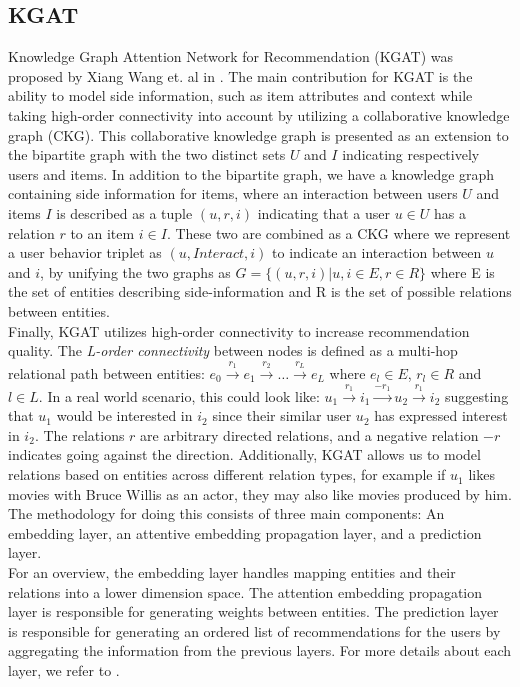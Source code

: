 \subsection{KGAT}
Knowledge Graph Attention Network for Recommendation (KGAT) was proposed by Xiang Wang et. al in \cite{KGAT}.
The main contribution for KGAT is the ability to model side information, such as item attributes and context while taking high-order connectivity into account by utilizing a collaborative knowledge graph (CKG).
This collaborative knowledge graph is presented as an extension to the bipartite graph with the two distinct sets $U$ and $I$ indicating respectively users and items.
In addition to the bipartite graph, we have a knowledge graph containing side information for items, where an interaction between users $U$ and items $I$ is described as a tuple $(u, r, i)$ indicating that a user $u \in U$ has a relation $r$ to an item $i \in I$.
These two are combined as a CKG where we represent a user behavior triplet as $(u, Interact, i)$ to indicate an interaction between $u$ and $i$, by unifying the two graphs as $G = \{(u, r, i) | u, i \in E, r \in R\}$ where E is the set of entities describing side-information and R is the set of possible relations between entities.\\
Finally, KGAT utilizes high-order connectivity to increase recommendation quality.
The \textit{L-order connectivity} between nodes is defined as a multi-hop relational path between entities: $e_0 \overset{r_1}{\rightarrow} e_1 \overset{r_2}{\rightarrow} \dots \overset{r_L}{\rightarrow} e_L$ where $e_l \in E$, $r_l \in R$ and $l \in L$.
In a real world scenario, this could look like: $u_1 \overset{r_1}{\rightarrow} i_1 \overset{-r_1}{\rightarrow} u_2 \overset{r_1}{\rightarrow} i_2$ suggesting that $u_1$ would be interested in $i_2$ since their similar user $u_2$ has expressed interest in $i_2$.
The relations $r$ are arbitrary directed relations, and a negative relation $-r$ indicates going against the direction.
Additionally, KGAT allows us to model relations based on entities across different relation types, for example if $u_1$ likes movies with Bruce Willis as an actor, they may also like movies produced by him.
\\
The methodology for doing this consists of three main components: An embedding layer, an attentive embedding propagation layer, and a prediction layer.\\
For an overview, the embedding layer handles mapping entities and their relations into a lower dimension space.
The attention embedding propagation layer is responsible for generating weights between entities.
The prediction layer is responsible for generating an ordered list of recommendations for the users by aggregating the information from the previous layers.
For more details about each layer, we refer to \cite{KGAT}.
